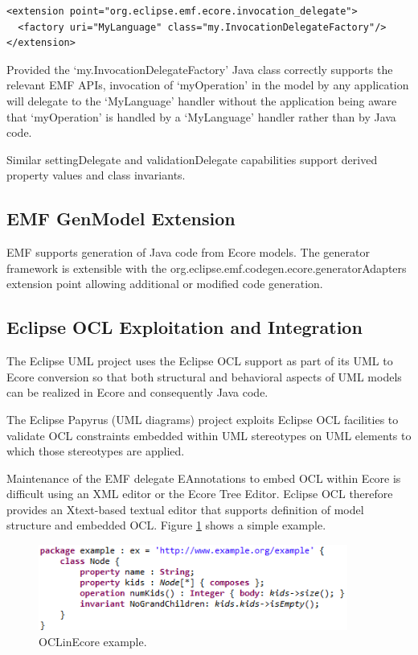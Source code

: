 \documentclass[a4paper]{article}
\begin{document}
\begin{verbatim}
<extension point="org.eclipse.emf.ecore.invocation_delegate">
  <factory uri="MyLanguage" class="my.InvocationDelegateFactory"/>
</extension>
\end{verbatim}

Provided the `my.InvocationDelegateFactory' Java class correctly supports the relevant EMF APIs, invocation of `myOperation' in the model by any application will delegate to the `MyLanguage' handler without the application being aware that `myOperation' is handled by a `MyLanguage' handler rather than by Java code.

Similar settingDelegate and validationDelegate capabilities support derived property values and class invariants.

\subsection{EMF GenModel Extension}

EMF supports generation of Java code from Ecore models. The generator framework is extensible with the org.eclipse.emf.codegen.ecore.generatorAdapters extension point allowing additional or modified code generation.

\subsection{Eclipse OCL Exploitation and Integration}

The Eclipse UML project uses the Eclipse OCL support as part of its UML to Ecore conversion so that both structural and behavioral aspects of UML models can be realized in Ecore and consequently Java code.

The Eclipse Papyrus (UML diagrams) project exploits Eclipse OCL facilities to validate OCL constraints embedded within UML stereotypes on UML elements to which those stereotypes are applied.

Maintenance of the EMF delegate EAnnotations to embed OCL within Ecore is difficult using an XML editor or the Ecore Tree Editor. Eclipse OCL therefore provides an Xtext-based textual editor that supports definition of model structure and embedded OCL. Figure \ref{fig:OCLinEcore} shows a simple example.
\begin{figure}
  \begin{center}
    \includegraphics[width=4.0in]{OCLinEcore.png}
  \end{center}
  \caption{OCLinEcore example.}
  \label{fig:OCLinEcore}
\end{figure}
\end{document}
